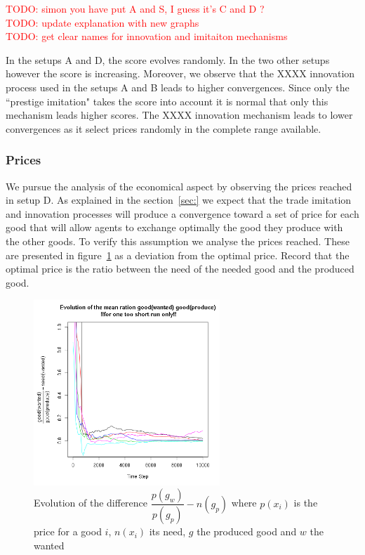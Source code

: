 \documentclass{wscpaperproc}
\newcommand{\memo}[2]{\textcolor{#1}{#2}}
\newcommand{\todo}[1]{\memo{red}{TODO: #1\\}}
\begin{document}
\todo{simon you have put A and S, I guess it's C and D ?}
\todo{update explanation with new graphs}
\todo{get clear names for innovation and imitaiton mechanisms}
 
In the setups A and D, the score evolves randomly. In the two other setups however the score is increasing. Moreover, we observe that the XXXX innovation process used in the setups A and B leads to higher convergences. Since only the ``prestige imitation" takes the score into account it is normal that only this mechanism leads higher scores. The XXXX innovation mechanism leads to lower convergences as it select prices randomly in the complete range available.

\subsubsection{Prices}

We pursue the analysis of the economical aspect by observing the prices reached in setup D. As explained in the section~\ref{sec:} we expect that the trade imitation and innovation processes will produce a convergence toward a set of price for each good that will allow agents to exchange optimally the good they produce with the other goods. To verify this assumption we analyse the prices reached. These are presented in figure~\ref{fig:ratioEvol} as a deviation from the optimal price. Record that the optimal price is the ratio between the need of the needed good and the produced good.

\begin{figure}[H]
	\begin{center}
		\includegraphics[width=7cm]{img/ratioEvol.png}
	\end{center}
	\caption{Evolution of the difference $\dfrac{p(g_w)}{p(g_p)}-n(g_p)$ where $p(x_i)$ is the price for a good $i$, $n(x_i)$ its need, $g$ the produced good and $w$ the wanted}
	\label{fig:ratioEvol}
\end{figure}
\end{document}
